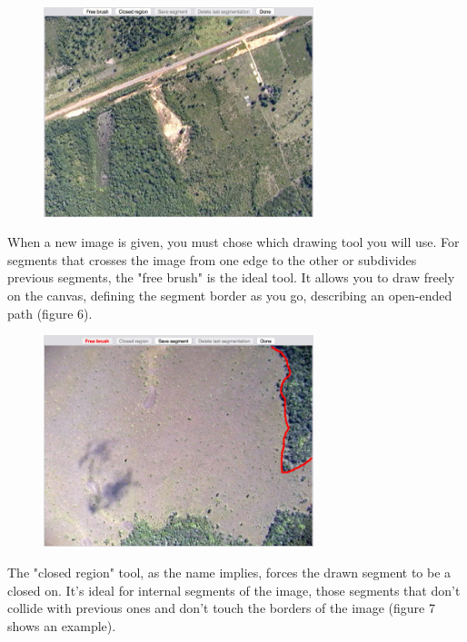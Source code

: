 \begin{figure}[h!]
  \centering
  \includegraphics[width=0.7\textwidth]{imgs/manualseginstr_fig5}
\end{figure}

When a new image is given, you must chose which drawing tool you will use. For segments that crosses the image from one edge to the other or subdivides previous segments, the "free brush" is the ideal tool. It allows you to draw freely on the canvas, defining the segment border as you go, describing an open-ended path (figure 6).

\begin{figure}[h!]
  \centering
  \includegraphics[width=0.7\textwidth]{imgs/manualseginstr_fig6}
\end{figure}

The "closed region" tool, as the name implies, forces the drawn segment to be a closed on. It's ideal for internal segments of the image, those segments that don't collide with previous ones and don't touch the borders of the image (figure 7 shows an example).

